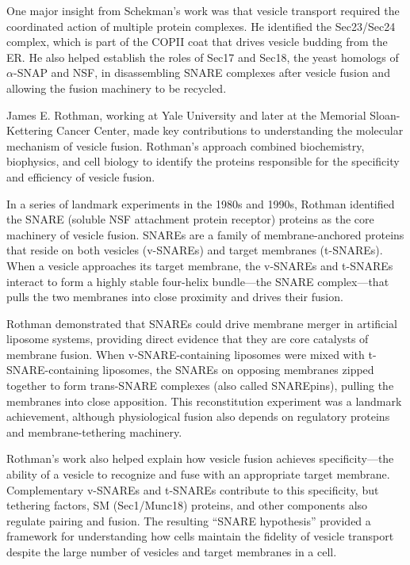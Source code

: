 One major insight from Schekman's work was that vesicle transport required the coordinated action of multiple protein complexes. He identified the Sec23/Sec24 complex, which is part of the COPII coat that drives vesicle budding from the ER. He also helped establish the roles of Sec17 and Sec18, the yeast homologs of $\alpha$-SNAP and NSF, in disassembling SNARE complexes after vesicle fusion and allowing the fusion machinery to be recycled.

James E. Rothman, working at Yale University and later at the Memorial Sloan-Kettering Cancer Center, made key contributions to understanding the molecular mechanism of vesicle fusion. Rothman's approach combined biochemistry, biophysics, and cell biology to identify the proteins responsible for the specificity and efficiency of vesicle fusion.

In a series of landmark experiments in the 1980s and 1990s, Rothman identified the SNARE (soluble NSF attachment protein receptor) proteins as the core machinery of vesicle fusion. SNAREs are a family of membrane-anchored proteins that reside on both vesicles (v-SNAREs) and target membranes (t-SNAREs). When a vesicle approaches its target membrane, the v-SNAREs and t-SNAREs interact to form a highly stable four-helix bundle---the SNARE complex---that pulls the two membranes into close proximity and drives their fusion.

Rothman demonstrated that SNAREs could drive membrane merger in artificial liposome systems, providing direct evidence that they are core catalysts of membrane fusion. When v-SNARE-containing liposomes were mixed with t-SNARE-containing liposomes, the SNAREs on opposing membranes zipped together to form trans-SNARE complexes (also called SNAREpins), pulling the membranes into close apposition. This reconstitution experiment was a landmark achievement, although physiological fusion also depends on regulatory proteins and membrane-tethering machinery.

Rothman's work also helped explain how vesicle fusion achieves specificity---the ability of a vesicle to recognize and fuse with an appropriate target membrane. Complementary v-SNAREs and t-SNAREs contribute to this specificity, but tethering factors, SM (Sec1/Munc18) proteins, and other components also regulate pairing and fusion. The resulting ``SNARE hypothesis'' provided a framework for understanding how cells maintain the fidelity of vesicle transport despite the large number of vesicles and target membranes in a cell.

